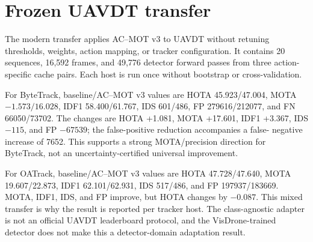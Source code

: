 \section{Frozen UAVDT transfer}
The modern transfer applies AC--MOT v3 to UAVDT without retuning thresholds,
weights, action mapping, or tracker configuration. It contains 20 sequences,
16,592 frames, and 49,776 detector forward passes from three action-specific
cache pairs. Each host is run once without bootstrap or cross-validation.

For ByteTrack, baseline/AC--MOT v3 values are HOTA 45.923/47.004, MOTA
$-1.573/16.028$, IDF1 58.400/61.767, IDS 601/486, FP 279616/212077, and FN
66050/73702. The changes are HOTA +1.081, MOTA +17.601, IDF1 +3.367, IDS
$-115$, and FP $-67539$; the false-positive reduction accompanies a false-
negative increase of 7652. This supports a strong MOTA/precision direction for
ByteTrack, not an uncertainty-certified universal improvement.

For OATrack, baseline/AC--MOT v3 values are HOTA 47.728/47.640, MOTA 19.607/22.873,
IDF1 62.101/62.931, IDS 517/486, and FP 197937/183669. MOTA, IDF1, IDS, and
FP improve, but HOTA changes by $-0.087$. This mixed transfer is why the result
is reported per tracker host. The class-agnostic adapter is not an official
UAVDT leaderboard protocol, and the VisDrone-trained detector does not make this
a detector-domain adaptation result.
